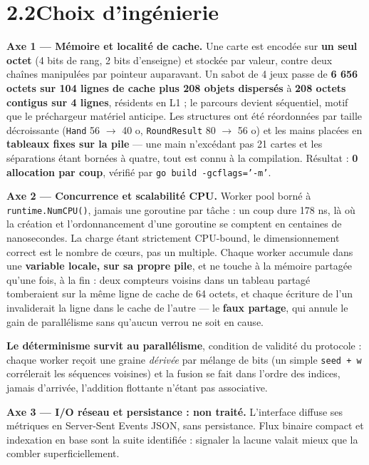 \documentclass[10pt,a4paper]{article}
\newcommand{\code}[1]{\texttt{\small #1}}
\begin{document}
\section{2.2\quad Choix d'ingénierie}

\textbf{Axe 1 — Mémoire et localité de cache.} Une carte est encodée sur \textbf{un seul
octet} (4 bits de rang, 2 bits d'enseigne) et stockée par valeur, contre deux chaînes
manipulées par pointeur auparavant. Un sabot de 4 jeux passe de \textbf{6 656 octets sur
104 lignes de cache plus 208 objets dispersés} à \textbf{208 octets contigus sur 4
lignes}, résidents en L1 ; le parcours devient séquentiel, motif que le préchargeur
matériel anticipe. Les structures ont été réordonnées par taille décroissante
(\code{Hand} 56 $\rightarrow$ 40 o, \code{RoundResult} 80 $\rightarrow$ 56 o) et les
mains placées en \textbf{tableaux fixes sur la pile} — une main n'excédant pas 21 cartes
et les séparations étant bornées à quatre, tout est connu à la compilation. Résultat :
\textbf{0 allocation par coup}, vérifié par \code{go build -gcflags='-m'}.

\textbf{Axe 2 — Concurrence et scalabilité CPU.} Worker pool borné à
\code{runtime.NumCPU()}, jamais une goroutine par tâche : un coup dure 178 ns, là où la
création et l'ordonnancement d'une goroutine se comptent en centaines de nanosecondes.
La charge étant strictement CPU-bound, le dimensionnement correct est le nombre de cœurs,
pas un multiple. Chaque worker accumule dans une \textbf{variable locale, sur sa propre
pile}, et ne touche à la mémoire partagée qu'une fois, à la fin : deux compteurs voisins
dans un tableau partagé tomberaient sur la même ligne de cache de 64 octets, et chaque
écriture de l'un invaliderait la ligne dans le cache de l'autre — le \textbf{faux
partage}, qui annule le gain de parallélisme sans qu'aucun verrou ne soit en cause.

\textbf{Le déterminisme survit au parallélisme}, condition de validité du protocole :
chaque worker reçoit une graine \emph{dérivée} par mélange de bits (un simple
\code{seed + w} corrélerait les séquences voisines) et la fusion se fait dans l'ordre des
indices, jamais d'arrivée, l'addition flottante n'étant pas associative.

\textbf{Axe 3 — I/O réseau et persistance : non traité.} L'interface diffuse ses métriques
en Server-Sent Events JSON, sans persistance. Flux binaire compact et indexation en base
sont la suite identifiée : signaler la lacune valait mieux que la combler superficiellement.
\end{document}
